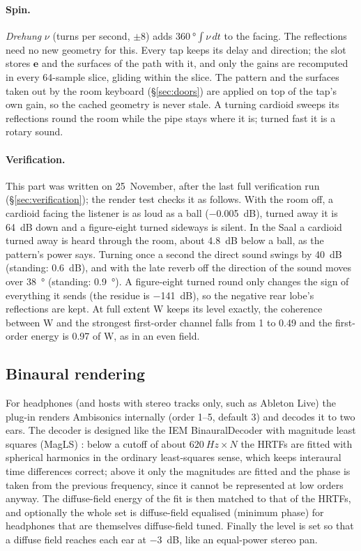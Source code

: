 \documentclass[11pt,a4paper,parskip=half,DIV=11,toc=bibliography]{scrartcl}
\newcommand{\ui}[1]{\emph{#1}}                 %
\begin{document}
\paragraph{Spin.} \ui{Drehung} $\nu$ (turns per second, $\pm8$) adds $\SI{360}{\degree}\int\nu\,dt$ to the facing. The reflections need
no new geometry for this. Every tap keeps its delay and direction; the slot stores $\mathbf e$ and the surfaces of the path with it,
and only the gains are recomputed in every \SI{64}{}-sample slice, gliding within the slice. The pattern and the surfaces taken out by
the room keyboard (\S\ref{sec:doors}) are applied on top of the tap's own gain, so the cached geometry is never stale. A turning cardioid
sweeps its reflections round the room while the pipe stays where it is; turned fast it is a rotary sound.

\paragraph{Verification.} This part was written on 25~November, after the last full verification run (\S\ref{sec:verification}); the
render test checks it as follows. With the room off, a cardioid facing the listener is as loud as a ball (\SI{-0.005}{dB}), turned away
it is \SI{64}{dB} down and a figure-eight turned sideways is silent. In the Saal a cardioid turned away is heard through the room, about
\SI{4.8}{dB} below a ball, as the pattern's power says. Turning once a second the direct sound swings by \SI{40}{dB} (standing:
\SI{0.6}{dB}), and with the late reverb off the direction of the sound moves over \SI{38}{\degree} (standing: \SI{0.9}{\degree}). A
figure-eight turned round only changes the sign of everything it sends (the residue is \SI{-141}{dB}), so the negative rear lobe's
reflections are kept. At full
extent W keeps its level exactly, the coherence between W and the strongest first-order channel falls from 1 to 0.49 and the
first-order energy is 0.97 of W, as in an even field.

\subsection{Binaural rendering}
\label{sec:binaural}
For headphones (and hosts with stereo tracks only, such as Ableton Live) the plug-in renders Ambisonics
internally (order 1--5, default 3) and decodes it to two ears. The decoder is designed like the IEM
BinauralDecoder \citep{iemsuite} with magnitude least squares (MagLS) \citep{schoerkhuber2018magls}:
below a cutoff of about $\SI{620}{Hz}\times N$ the HRTFs are fitted with spherical harmonics in the
ordinary least-squares sense, which keeps interaural time differences correct; above it only the
magnitudes are fitted and the phase is taken from the previous frequency, since it cannot be represented
at low orders anyway. The diffuse-field energy of the fit is then matched to that of the HRTFs, and
optionally the whole set is diffuse-field equalised (minimum phase) for headphones that are themselves
diffuse-field tuned. Finally the level is set so that a diffuse field reaches each ear at \SI{-3}{dB},
like an equal-power stereo pan.
\end{document}
